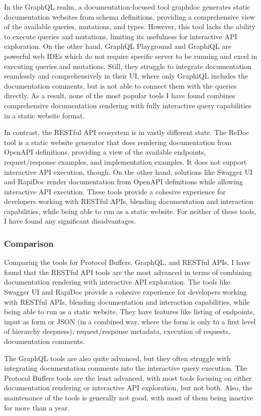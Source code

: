 In the GraphQL realm, a documentation-focused tool graphdoc generates static documentation websites from schema definitions, providing a comprehensive view of the available queries, mutations, and types.
However, this tool lacks the ability to execute queries and mutations, limiting its usefulness for interactive API exploration.
On the other hand, GraphQL Playground and GraphiQL are powerful web IDEs which do not require specific server to be running and excel in executing queries and mutations.
Still, they struggle to integrate documentation seamlessly and comprehensively in their UI, where only GraphiQL includes the documentation comments, but is not able to connect them with the queries directly.
As a result, none of the most popular tools I have found combines comprehensive documentation rendering with fully interactive query capabilities in a static website format.

In contrast, the RESTful API ecosystem is in vastly different state.
The ReDoc tool is a static website generator that does rendering documentation from OpenAPI definitions, providing a view of the available endpoints, request/response examples, and implementation examples.
It does not support interactive API execution, though.
On the other hand, solutions like Swagger UI and RapiDoc render documentation from OpenAPI definitions while allowing interactive API execution.
These tools provide a cohesive experience for developers working with RESTful APIs, blending documentation and interaction capabilities, while being able to run as a static website.
For neither of these tools, I have found any significant disadvantages.

\subsubsection{Comparison}
Comparing the tools for Protocol Buffers, GraphQL, and RESTful APIs, I have found that the RESTful API tools are the most advanced in terms of combining documentation rendering with interactive API exploration.
The tools like Swagger UI and RapiDoc provide a cohesive experience for developers working with RESTful APIs, blending documentation and interaction capabilities, while being able to run as a static website.
They have features like listing of endpoints, input as form or JSON (in a combined way, where the form is only to a first level of hierarchy deepness), request/response metadata, execution of requests, documentation comments.

The GraphQL tools are also quite advanced, but they often struggle with integrating documentation comments into the interactive query execution.
The Protocol Buffers tools are the least advanced, with most tools focusing on either documentation rendering or interactive API exploration, but not both.
Also, the maintenance of the tools is generally not good, with most of them being inactive for more than a year.

